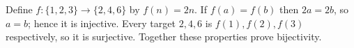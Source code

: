 Define $f:\{1,2,3\}\to\{2,4,6\}$ by $f(n)=2n$. If $f(a)=f(b)$ then $2a=2b$, so $a=b$; hence it is injective. Every target $2,4,6$ is $f(1),f(2),f(3)$ respectively, so it is surjective. Together these properties prove bijectivity.
